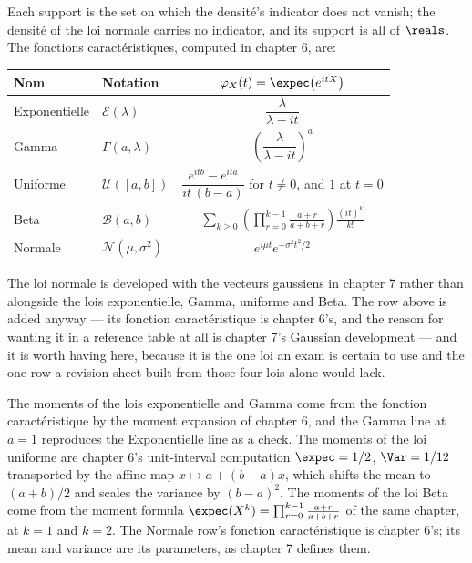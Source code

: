 Each support is the set on which the densité's indicator does not vanish; the
densité of the loi normale carries no indicator, and its support is all of
$\reals$. The fonctions caractéristiques, computed in chapter 6, are:

\begin{center}
\footnotesize
\setlength{\tabcolsep}{6pt}
\begin{tabular}{llc}
  \toprule
  Nom & Notation & $\varphi_{X}(t) = \expec\!\left(e^{itX}\right)$ \\
  \midrule
  Exponentielle & $\mathcal{E}(\lambda)$ & $\dfrac{\lambda}{\lambda - it}$ \\[5pt]
  Gamma & $\Gamma(a,\lambda)$
    & $\left(\dfrac{\lambda}{\lambda - it}\right)^{a}$ \\[7pt]
  Uniforme & $\mathcal{U}([a,b])$
    & $\dfrac{e^{itb} - e^{ita}}{it\,(b-a)}$ for $t \neq 0$, and $1$ at $t = 0$
    \\[7pt]
  Beta & $\mathcal{B}(a,b)$
    & $\displaystyle\sum_{k \geq 0}
      \left(\prod_{r=0}^{k-1}\frac{a+r}{a+b+r}\right)\frac{(it)^{k}}{k!}$ \\[9pt]
  Normale & $\mathcal{N}(\mu,\sigma^{2})$
    & $e^{i\mu t}e^{-\sigma^{2}t^{2}/2}$ \\
  \bottomrule
\end{tabular}
\end{center}

\begin{remark}
  The loi normale is developed with the vecteurs gaussiens in chapter 7 rather
  than alongside the lois exponentielle, Gamma, uniforme and Beta. The row above is
  added anyway --- its fonction caractéristique is chapter 6's, and the reason for
  wanting it in a reference table at all is chapter 7's Gaussian development ---
  and it is worth having here, because it is the one loi an exam is certain to use
  and the one row a revision sheet built from those four lois alone would lack.
\end{remark}

\begin{remark}
  The moments of the lois exponentielle and Gamma come from the fonction
  caractéristique by the moment expansion of chapter 6, and the Gamma line at
  $a = 1$ reproduces the Exponentielle line as a check. The moments of the loi
  uniforme are chapter 6's unit-interval
  computation $\expec = 1/2$, $\Var = 1/12$ transported by the affine map
  $x \mapsto a + (b-a)x$, which shifts the mean to $(a+b)/2$ and scales the variance
  by $(b-a)^{2}$. The moments of the loi Beta come from the moment formula
  $\expec(X^{k}) = \prod_{r=0}^{k-1}\frac{a+r}{a+b+r}$ of the same chapter, at
  $k = 1$ and $k = 2$. The Normale row's fonction caractéristique is chapter 6's;
  its mean and variance are its parameters, as chapter 7 defines them.
\end{remark}

